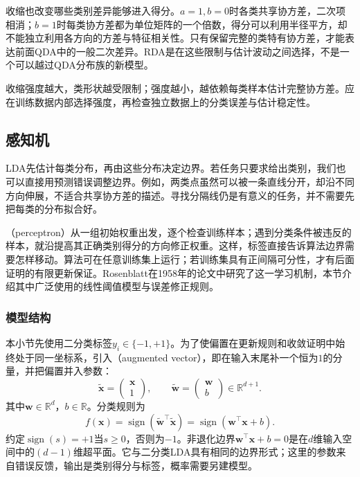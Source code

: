 收缩也改变哪些类别差异能够进入得分。$a=1,b=0$时各类共享协方差，二次项相消；$b=1$时每类协方差都为单位矩阵的一个倍数，得分可以利用半径平方，却不能独立利用各方向的方差与特征相关性。只有保留完整的类特有协方差，才能表达前面QDA中的一般二次差异。RDA是在这些限制与估计波动之间选择，不是一个可以越过QDA分布族的新模型。

收缩强度越大，类形状越受限制；强度越小，越依赖每类样本估计完整协方差。应在训练数据内部选择强度，再检查独立数据上的分类误差与估计稳定性。

\subsection{感知机}
\label{sec:classification-perceptron}

LDA先估计每类分布，再由这些分布决定边界。若任务只要求给出类别，我们也可以直接用预测错误调整边界。例如，两类点虽然可以被一条直线分开，却沿不同方向伸展，不适合共享协方差的描述。寻找分隔线仍是有意义的任务，并不需要先把每类的分布拟合好。

（perceptron）从一组初始权重出发，逐个检查训练样本；遇到分类条件被违反的样本，就沿提高其正确类别得分的方向修正权重。这样，标签直接告诉算法边界需要怎样移动。算法可在任意训练集上运行；若训练集具有正间隔可分性，才有后面证明的有限更新保证。Rosenblatt在1958年的论文中研究了这一学习机制，本节介绍其中广泛使用的线性阈值模型与误差修正规则。

\subsubsection{模型结构}
\label{sec:classification-perceptron-model}

本小节先使用二分类标签$y_i\in\{-1,+1\}$。为了使偏置在更新规则和收敛证明中始终处于同一坐标系，引入（augmented vector），即在输入末尾补一个恒为$1$的分量，并把偏置并入参数：\begin{equation}
  \label{eq:classification-perceptron-augmented}
  \tilde{\bm{x}}=
    \begin{pmatrix}\bm{x}\\1\end{pmatrix},\qquad
  \tilde{\bm{w}}=
    \begin{pmatrix}\bm{w}\\b\end{pmatrix}
    \in\mathbb{R}^{d+1}.
\end{equation}
其中$\bm{w}\in\mathbb{R}^{d}$，$b\in\mathbb{R}$。分类规则为
\begin{equation}
  \label{eq:classification-perceptron-prediction}
  f(\bm{x})=\operatorname{sign}
    (\tilde{\bm{w}}^{\top}\tilde{\bm{x}})
    =\operatorname{sign}(\bm{w}^{\top}\bm{x}+b).
\end{equation}
约定$\operatorname{sign}(s)=+1$当$s\geq0$，否则为$-1$。非退化边界$\bm{w}^{\top}\bm{x}+b=0$是在$d$维输入空间中的$(d-1)$维超平面。它与二分类LDA具有相同的边界形式；这里的参数来自错误反馈，输出是类别得分与标签，概率需要另建模型。

